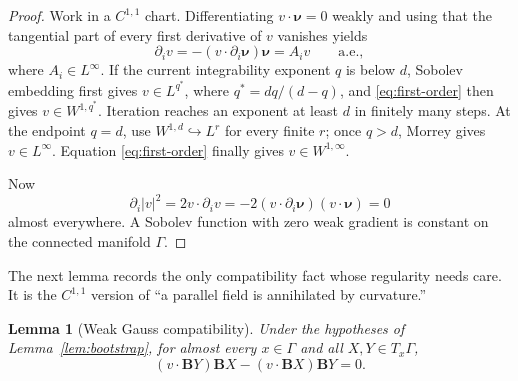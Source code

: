 \documentclass[11pt]{article}
\newtheorem{lemma}[theorem]{Lemma}
\newcommand{\G}{\Gamma}
\newcommand{\nuG}{\boldsymbol\nu}
\newcommand{\BG}{\mathbf B}
\begin{document}
\begin{proof}
Work in a $C^{1,1}$ chart.  Differentiating $v\cdot\nuG=0$ weakly and using
that the tangential part of every first derivative of $v$ vanishes yields
\begin{equation}\label{eq:first-order}
 \partial_i v=-(v\cdot\partial_i\nuG)\nuG=A_i v
 \qquad\text{a.e.},
\end{equation}
where $A_i\in L^\infty$.  If the current integrability exponent $q$ is below
$d$, Sobolev embedding first gives $v\in L^{q^*}$, where
$q^*=dq/(d-q)$, and \eqref{eq:first-order} then gives
$v\in W^{1,q^*}$.  Iteration reaches an exponent at least $d$ in finitely
many steps.  At the endpoint $q=d$, use $W^{1,d}\hookrightarrow L^r$ for
every finite $r$; once $q>d$, Morrey gives $v\in L^\infty$.  Equation
\eqref{eq:first-order} finally gives $v\in W^{1,\infty}$.

Now
\[
 \partial_i|v|^2=2v\cdot\partial_i v
 =-2(v\cdot\partial_i\nuG)(v\cdot\nuG)=0
\]
almost everywhere.  A Sobolev function with zero weak gradient is constant
on the connected manifold $\G$.
\end{proof}

The next lemma records the only compatibility fact whose regularity needs
care.  It is the $C^{1,1}$ version of ``a parallel field is annihilated by
curvature.''

\begin{lemma}[Weak Gauss compatibility]\label{lem:weak-gauss}
Under the hypotheses of Lemma~\ref{lem:bootstrap}, for almost every
$x\in\G$ and all $X,Y\in T_x\G$,
\begin{equation}\label{eq:gauss-compatibility}
 (v\cdot\BG Y)\BG X-(v\cdot\BG X)\BG Y=0.
\end{equation}
\end{lemma}
\end{document}
